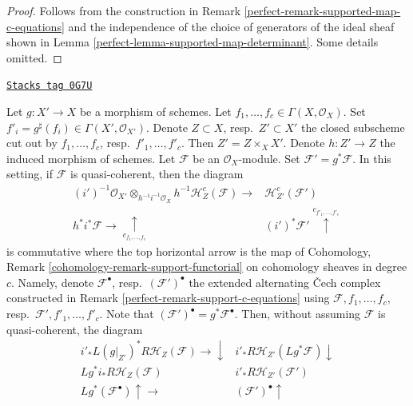 \begin{proof}

Follows from the construction in
Remark \ref{perfect-remark-supported-map-c-equations}
and the independence of the choice
of generators of the ideal sheaf shown in
Lemma \ref{perfect-lemma-supported-map-determinant}.
Some details omitted.
\end{proof}

\begin{remark}
\label{perfect-remark-supported-functorial}
\href{https://stacks.math.columbia.edu/tag/0G7U}{\texttt{Stacks tag 0G7U}}

Let $g : X' \to X$ be a morphism of schemes. Let
$f_1, \ldots, f_c \in \Gamma(X, \mathcal{O}_X)$.
Set $f'_i = g^\sharp(f_i) \in \Gamma(X', \mathcal{O}_{X'})$.
Denote $Z \subset X$, resp.\ $Z' \subset X'$ the closed
subscheme cut out by $f_1, \ldots, f_c$, resp.\ $f'_1, \ldots, f'_c$.
Then $Z' = Z \times_X X'$. Denote $h : Z' \to Z$ the induced morphism
of schemes.
Let $\mathcal{F}$ be an $\mathcal{O}_X$-module.
Set $\mathcal{F}' = g^*\mathcal{F}$.
In this setting, if $\mathcal{F}$ is quasi-coherent, then the diagram
$$
\begin{array}{cc}(i')^{-1}\mathcal{O}_{X'} \otimes_{h^{-1}i^{-1}\mathcal{O}_X}
h^{-1}\mathcal{H}^c_Z(\mathcal{F}) \longrightarrow & \mathcal{H}_{Z'}^c(\mathcal{F}') \\ h^*i^*\mathcal{F} \longrightarrow\underset{c_{f_1, \ldots, f_c}}{\uparrow} & (i')^*\mathcal{F}' \overset{c_{f'_1, \ldots, f'_c}}{\uparrow}\end{array}
$$
is commutative where the top horizontal arrow is
the map of Cohomology, Remark \ref{cohomology-remark-support-functorial}
on cohomology sheaves in degree $c$. Namely,
denote $\mathcal{F}^\bullet$, resp.\ $(\mathcal{F}')^\bullet$
the extended alternating {\v C}ech complex constructed in
Remark \ref{perfect-remark-support-c-equations}
using $\mathcal{F}, f_1, \ldots, f_c$,
resp.\ $\mathcal{F}', f'_1, \ldots, f'_c$.
Note that $(\mathcal{F}')^\bullet = g^*\mathcal{F}^\bullet$.
Then, without assuming $\mathcal{F}$ is quasi-coherent, the diagram
$$
\begin{array}{cc}i'_* L(g|_{Z'})^* R\mathcal{H}_Z(\mathcal{F}) \longrightarrow\downarrow & i'_*R\mathcal{H}_{Z'}(Lg^*\mathcal{F}) \downarrow \\ Lg^*i_*R\mathcal{H}_Z(\mathcal{F}) & i'_*R\mathcal{H}_{Z'}(\mathcal{F}') \\ Lg^*(\mathcal{F}^\bullet) \uparrow\longrightarrow & (\mathcal{F}')^\bullet \uparrow\end{array}
$$
\end{remark}
